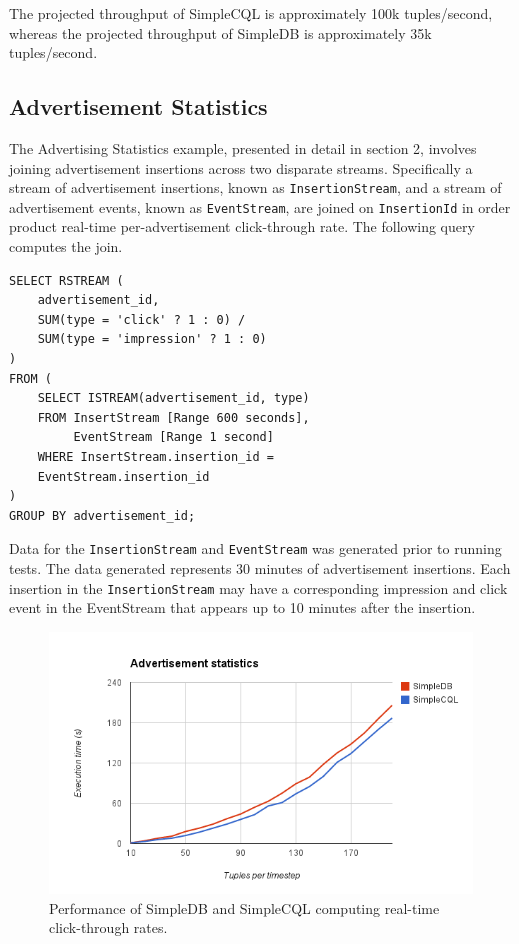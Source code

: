 \documentclass[a4paper, 10pt, conference]{IEEEconf}
\begin{document}
The projected throughput of SimpleCQL is approximately 100k tuples/second, whereas the projected throughput of SimpleDB is approximately 35k tuples/second.

\subsection{Advertisement Statistics}
The Advertising Statistics example, presented in detail in section 2, involves joining advertisement insertions across two disparate streams.  Specifically a stream of advertisement insertions, known as \texttt{InsertionStream}, and a stream of advertisement events, known as \texttt{EventStream}, are joined on \texttt{InsertionId} in order product real-time per-advertisement click-through rate.  The following query computes the join.

\begin{lstlisting}
SELECT RSTREAM (
    advertisement_id,
    SUM(type = 'click' ? 1 : 0) / 
    SUM(type = 'impression' ? 1 : 0)
)
FROM (
    SELECT ISTREAM(advertisement_id, type)
    FROM InsertStream [Range 600 seconds], 
         EventStream [Range 1 second] 
    WHERE InsertStream.insertion_id = 
    EventStream.insertion_id
) 
GROUP BY advertisement_id;
\end{lstlisting}

Data for the \texttt{InsertionStream} and \texttt{EventStream} was generated prior to running tests.  The data generated represents 30 minutes of advertisement insertions.  Each insertion in the \texttt{InsertionStream} may have a corresponding impression and click event in the EventStream that appears up to 10 minutes after the insertion.

\begin{figure}[h!]
    \centering
    \centerline{\includegraphics[totalheight=5cm]{ads.png}}
    \caption{Performance of SimpleDB and SimpleCQL computing real-time click-through rates.}
    \label{fig:ads}
\end{figure}
\end{document}
